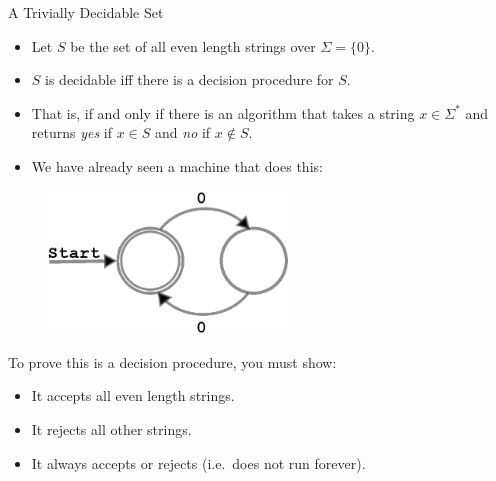 \documentclass[style=sailor,size=12pt]{powerdot}
\begin{document}
\begin{wideslide}[bm=,toc=]{A Trivially Decidable Set}
\begin{itemize}
\item<1-> Let $S$ be the set of all even length strings over $\Sigma = \{0\}$. 
\item<2-> $S$ is decidable iff there is a decision procedure for $S$.
\item<3-> That is, if and only if there is an algorithm that takes a string $x \in
\Sigma^*$ and returns \emph{yes} if $x \in S$ and \emph{no} if $x \notin S$.
\item<4-> We have already seen a machine that does this: \pause[4]
\end{itemize}
\begin{figure}[h]
\centering
\includegraphics[width=2.5in, height=.75in,keepaspectratio=true]{evenzeroautomata.eps}
\label{2sp}
\end{figure}
\pause
To prove this is a decision procedure, you must show:
\begin{itemize}
\item<7-> It accepts all even length strings. 
\item<7-> It rejects all other strings. 
\item<7-> It always accepts or rejects (i.e.\ does not run forever).
\end{itemize}
\end{wideslide}
\end{document}
